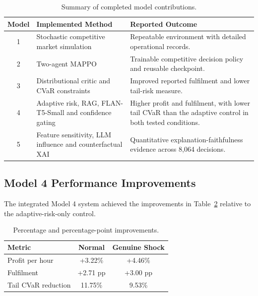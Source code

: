 \documentclass[conference]{IEEEtran}
\begin{document}
\begin{table}[!t]
\centering
\caption{Summary of completed model contributions.}
\label{tab:summary}
\small
\renewcommand{\arraystretch}{1.1}
\begin{tabularx}{\columnwidth}{c>{\raggedright\arraybackslash}p{30mm}>{\raggedright\arraybackslash}X}
\toprule
\textbf{Model} & \textbf{Implemented Method} & \textbf{Reported Outcome} \\
\midrule
1 & Stochastic competitive market simulation & Repeatable environment with detailed operational records. \\
2 & Two-agent MAPPO & Trainable competitive decision policy and reusable checkpoint. \\
3 & Distributional critic and CVaR constraints & Improved reported fulfilment and lower tail-risk measure. \\
4 & Adaptive risk, RAG, FLAN-T5-Small and confidence gating & Higher profit and fulfilment, with lower tail CVaR than the adaptive control in both tested conditions. \\
5 & Feature sensitivity, LLM influence and counterfactual XAI & Quantitative explanation-faithfulness evidence across 8,064 decisions. \\
\bottomrule
\end{tabularx}
\end{table}

\subsection{Model 4 Performance Improvements}
The integrated Model 4 system achieved the improvements in Table~\ref{tab:improve} relative to the adaptive-risk-only control.

\begin{table}[!t]
\centering
\caption{Percentage and percentage-point improvements.}
\label{tab:improve}
\small
\begin{tabular}{lcc}
\toprule
\textbf{Metric} & \textbf{Normal} & \textbf{Genuine Shock} \\
\midrule
Profit per hour     & +3.22\%  & +4.46\% \\
Fulfilment          & +2.71 pp & +3.00 pp \\
Tail CVaR reduction & 11.75\%  & 9.53\% \\
\bottomrule
\end{tabular}
\end{table}
\end{document}
